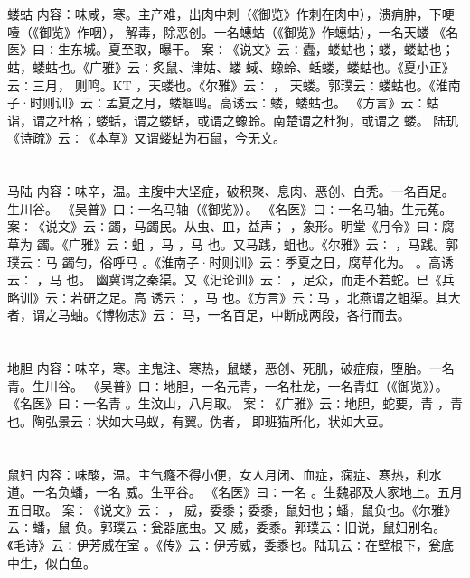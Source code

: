 \documentclass[12pt,UTF8]{ctexbook}
\begin{document}
\chapter{}蝼蛄
内容：味咸，寒。主产难，出肉中刺（《御览》作刺在肉中），溃痈肿，下哽噎（《御览》作咽）， 
解毒，除恶创。一名蟪蛄（《御览》作蟪蛄），一名天蝼 
《名医》曰∶生东城。夏至取，曝干。 
案∶《说文》云∶蠹，蝼蛄也；蝼，蝼蛄也；蛄，蝼蛄也。《广雅》云∶炙鼠、津姑、蝼 
蜮、蟓蛉、蛞蝼，蝼蛄也。《夏小正》云∶三月， 则鸣。KT ，天蝼也。《尔雅》云∶ ， 
天蝼。郭璞云∶蝼蛄也。《淮南子·时则训》云∶孟夏之月，蝼蝈鸣。高诱云∶蝼，蝼蛄也。 
《方言》云∶蛄诣，谓之杜格；蝼蛞，谓之蝼蛞，或谓之蟓蛉。南楚谓之杜狗，或谓之 蝼。 
陆玑《诗疏》云∶《本草》又谓蝼蛄为石鼠，今无文。 


\chapter{}马陆
内容：味辛，温。主腹中大坚症，破积聚、息肉、恶创、白秃。一名百足。生川谷。 
《吴普》曰∶一名马轴（《御览》）。 
《名医》曰∶一名马轴。生元菟。 
案∶《说文》云∶蠲，马蠲民。从虫、皿，益声； ，象形。明堂《月令》曰∶腐草为 
蠲。《广雅》云∶蛆 ，马 ，马 也。又马践，蛆也。《尔雅》云∶ ，马践。郭璞云∶马 
蠲匀，俗呼马 。《淮南子·时则训》云∶季夏之日，腐草化为。 。高诱云∶ ，马 也。 
幽冀谓之秦渠。又《汜论训》云∶ ，足众，而走不若蛇。已《兵略训》云∶若研之足。高 
诱云∶ ，马 也。《方言》云∶马 ，北燕谓之蛆渠。其大者，谓之马蚰。《博物志》云∶ 
马，一名百足，中断成两段，各行而去。 


\chapter{}地胆
内容：味辛，寒。主鬼注、寒热，鼠蝼，恶创、死肌，破症瘕，堕胎。一名 青。生川谷。 
《吴普》曰∶地胆，一名元青，一名杜龙，一名青虹（《御览》）。 
《名医》曰∶一名青 。生汶山，八月取。 
案∶《广雅》云∶地胆，蛇要，青 ，青 也。陶弘景云∶状如大马蚁，有翼。伪者， 
即班猫所化，状如大豆。 


\chapter{}鼠妇
内容：味酸，温。主气癃不得小便，女人月闭、血症，痫症、寒热，利水道。一名负蟠，一名 
威。生平谷。 
《名医》曰∶一名 。生魏郡及人家地上。五月五日取。 
案∶《说文》云∶ ， 威，委黍；委黍，鼠妇也；蟠，鼠负也。《尔雅》云∶蟠，鼠 
负。郭璞云∶瓮器底虫。又 威，委黍。郭璞云∶旧说，鼠妇别名。《毛诗》云∶伊芳威在室 
。《传》云∶伊芳威，委黍也。陆玑云∶在壁根下，瓮底中生，似白鱼。 
\end{document}
